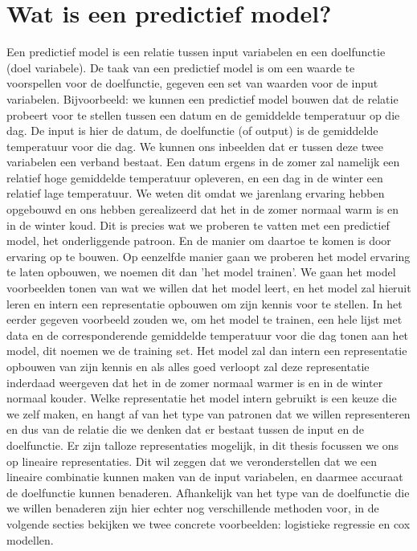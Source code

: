 \section{Wat is een predictief model?}
\label{sec:D:pm}
Een predictief model is een relatie tussen input variabelen en een doelfunctie (doel variabele). De taak van een predictief model is om een waarde te voorspellen voor de doelfunctie, gegeven een set van waarden voor de input variabelen. Bijvoorbeeld: we kunnen een predictief model bouwen dat de relatie probeert voor te stellen tussen een datum en de gemiddelde temperatuur op die dag. De input is hier de datum, de doelfunctie (of output) is de gemiddelde temperatuur voor die dag. We kunnen ons inbeelden dat er tussen deze twee variabelen een verband bestaat. Een datum ergens in de zomer zal namelijk een relatief hoge gemiddelde temperatuur opleveren, en een dag in de winter een relatief lage temperatuur. We weten dit omdat we jarenlang ervaring hebben opgebouwd en ons hebben gerealizeerd dat het in de zomer normaal warm is en in de winter koud. Dit is precies wat we proberen te vatten met een predictief model, het onderliggende patroon. En de manier om daartoe te komen is door ervaring op te bouwen. Op eenzelfde manier gaan we proberen het model ervaring te laten opbouwen, we noemen dit dan 'het model trainen'. We gaan het model voorbeelden tonen van wat we willen dat het model leert, en het model zal hieruit leren en intern een representatie opbouwen om zijn kennis voor te stellen. In het eerder gegeven voorbeeld zouden we, om het model te trainen, een hele lijst met data en de corresponderende gemiddelde temperatuur voor die dag tonen aan het model, dit noemen we de training set. Het model zal dan intern een representatie opbouwen van zijn kennis en als alles goed verloopt zal deze representatie inderdaad weergeven dat het in de zomer normaal warmer is en in de winter normaal kouder. Welke representatie het model intern gebruikt is een keuze die we zelf maken, en hangt af van het type van patronen dat we willen representeren en dus van de relatie die we denken dat er bestaat tussen de input en de doelfunctie. Er zijn talloze representaties mogelijk, in dit thesis focussen we ons op lineaire representaties. Dit wil zeggen dat we veronderstellen dat we een lineaire combinatie kunnen maken van de input variabelen, en daarmee accuraat de doelfunctie kunnen benaderen. Afhankelijk van het type van de doelfunctie die we willen benaderen zijn hier echter nog verschillende methoden voor, in de volgende secties bekijken we twee concrete voorbeelden: logistieke regressie en cox modellen.

